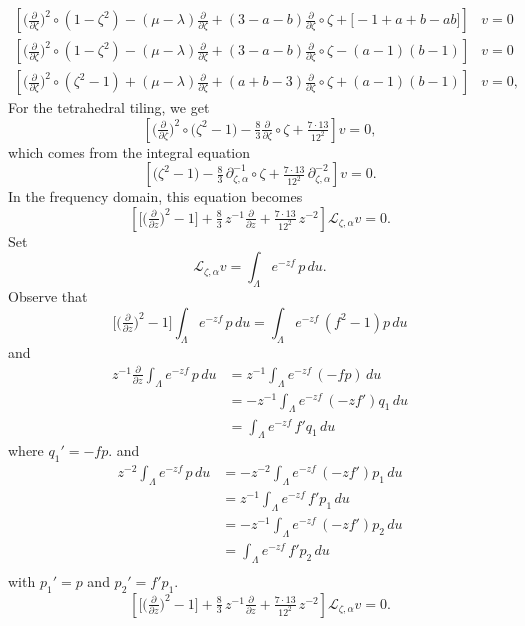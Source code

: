\documentclass{article}
\theoremstyle{plain}
\newcommand{\laplace}{\mathcal{L}}
\newcommand{\fracderiv}[3]{\partial^{#1}_{#2, #3}}
\begin{document}
\begin{align*}
\left[\big(\tfrac{\partial}{\partial \zeta}\big)^2 \circ (1 - \zeta^2) - (\mu - \lambda) \tfrac{\partial}{\partial \zeta} + (3-a-b) \tfrac{\partial}{\partial \zeta} \circ \zeta + \big[ {-}1 + a + b - ab \big]\right] & v = 0 \\
\left[\big(\tfrac{\partial}{\partial \zeta}\big)^2 \circ (1 - \zeta^2) - (\mu - \lambda) \tfrac{\partial}{\partial \zeta} + (3-a-b) \tfrac{\partial}{\partial \zeta} \circ \zeta - (a-1)(b-1)\right] & v = 0 \\
\left[\big(\tfrac{\partial}{\partial \zeta}\big)^2 \circ (\zeta^2 - 1) + (\mu - \lambda) \tfrac{\partial}{\partial \zeta} + (a+b-3) \tfrac{\partial}{\partial \zeta} \circ \zeta + (a-1)(b-1)\right] & v = 0,
\end{align*}
For the tetrahedral tiling, we get
\[ \left[\big(\tfrac{\partial}{\partial \zeta}\big)^2 \circ \big(\zeta^2 - 1\big) - \tfrac{8}{3} \tfrac{\partial}{\partial \zeta} \circ \zeta + \tfrac{7 \cdot 13}{12^2}\right] v = 0, \]
which comes from the integral equation
\[ \left[\big(\zeta^2 - 1\big) - \tfrac{8}{3}\,\fracderiv{-1}{\zeta}{\alpha} \circ \zeta + \tfrac{7 \cdot 13}{12^2}\,\fracderiv{-2}{\zeta}{\alpha}\right] v = 0. \]
In the frequency domain, this equation becomes
\[ \left[\big[\big(\tfrac{\partial}{\partial z}\big)^2 - 1\big] + \tfrac{8}{3}\,z^{-1} \tfrac{\partial}{\partial z} + \tfrac{7 \cdot 13}{12^2}\,z^{-2}\right] \laplace_{\zeta, \alpha} v = 0. \]
\color{black}
\color{SpringGreen}
Set
\[ \laplace_{\zeta, \alpha} v = \int_\Lambda e^{-zf}\,p\,du. \]
Observe that
\[ \big[\big(\tfrac{\partial}{\partial z}\big)^2 - 1\big] \int_\Lambda e^{-zf}\,p\,du = \int_\Lambda e^{-zf}\,(f^2 - 1)p\,du \]
and
\begin{align*}
z^{-1} \tfrac{\partial}{\partial z} \int_\Lambda e^{-zf}\,p\,du & = z^{-1} \int_\Lambda e^{-zf}\,(-fp)\,du \\
& = -z^{-1} \int_\Lambda e^{-zf}\,(-zf')q_1\,du \\
& = \int_\Lambda e^{-zf}\,f'q_1\,du
\end{align*}
where $q_1' = -fp$.
and
\begin{align*}
z^{-2} \int_\Lambda e^{-zf}\,p\,du
& = -z^{-2} \int_\Lambda e^{-zf}\,(-zf')p_1\,du \\
& = z^{-1} \int_\Lambda e^{-zf}\,f'p_1\,du \\
& = -z^{-1} \int_\Lambda e^{-zf}\,(-zf')p_2\,du \\
& = \int_\Lambda e^{-zf}\,f'p_2\,du \\
\end{align*}
with $p_1' = p$ and $p_2' = f'p_1$.
\[ \left[\big[\big(\tfrac{\partial}{\partial z}\big)^2 - 1\big] + \tfrac{8}{3}\,z^{-1} \tfrac{\partial}{\partial z} + \tfrac{7 \cdot 13}{12^2}\,z^{-2}\right] \laplace_{\zeta, \alpha} v = 0. \]
\color{black}
\end{document}
